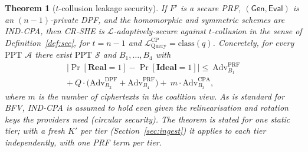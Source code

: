 \documentclass[a4paper,fleqn]{cas-dc}
\newtheorem{theorem}{Theorem}
\newcommand{\PPT}{\mathrm{PPT}}
\newcommand{\Real}{\mathbf{Real}}
\newcommand{\Ideal}{\mathbf{Ideal}}
\newcommand{\Leak}{\mathcal{L}}
\newcommand{\Sim}{\mathcal{S}}
\newcommand{\Adv}{\mathcal{A}}
\newcommand{\Gen}{\mathsf{Gen}}
\newcommand{\Eval}{\mathsf{Eval}}
\begin{document}
\begin{theorem}[$t$-collusion leakage security]
\label{thm:sec}
If $F'$ is a secure PRF, $(\Gen,\Eval)$ is an $(n{-}1)$-private DPF, and the
homomorphic and symmetric schemes are IND-CPA, then CR-SHE is
$\Leak$-adaptively-secure against $t$-collusion in the sense of
Definition~\ref{def:sec}, for $t=n-1$ and
$\Leak^{\text{CP}}_{\mathrm{Query}}=\mathrm{class}(q)$. Concretely, for every
$\PPT$ $\Adv$ there exist $\PPT$ $\Sim$ and $B_1,\dots,B_4$ with
\begin{multline*}
\big|\Pr[\Real{=}1]-\Pr[\Ideal{=}1]\big|
\le\ \mathrm{Adv}^{\mathrm{PRF}}_{B_1}\\
+\ Q\cdot\big(\mathrm{Adv}^{\mathrm{DPF}}_{B_2}
+\mathrm{Adv}^{\mathrm{PRF}}_{B_4}\big)
+\ m\cdot\mathrm{Adv}^{\mathrm{CPA}}_{B_3},
\end{multline*}
where $m$ is the number of ciphertexts in the coalition view. As is standard
for BFV, IND-CPA is assumed to hold even given the relinearisation and
rotation keys the providers need (circular security). The theorem is stated
for one static tier; with a fresh $K'$ per tier
(Section~\ref{sec:ingest}) it applies to each tier independently, with one PRF
term per tier.
\end{theorem}
\end{document}
